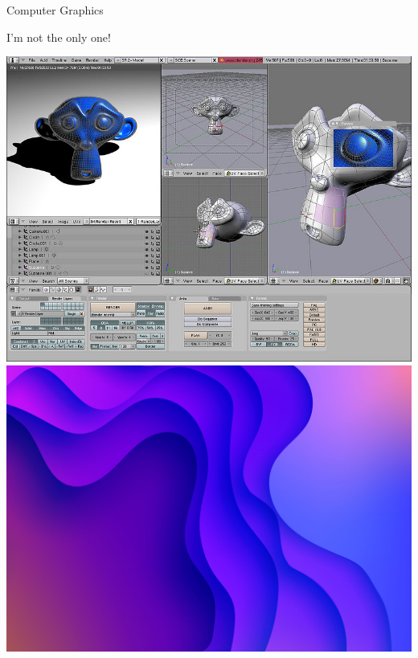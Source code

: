 \documentclass{beamer}
\begin{document}
\begin{frame}{Computer Graphics}
  \begin{center}
    \LARGE I'm not the only one!
  
    \vspace{5mm}

    \includegraphics[scale=0.18]{monkey}
    \includegraphics[scale=0.08]{vector1}
  \end{center}
\end{frame}
\end{document}
